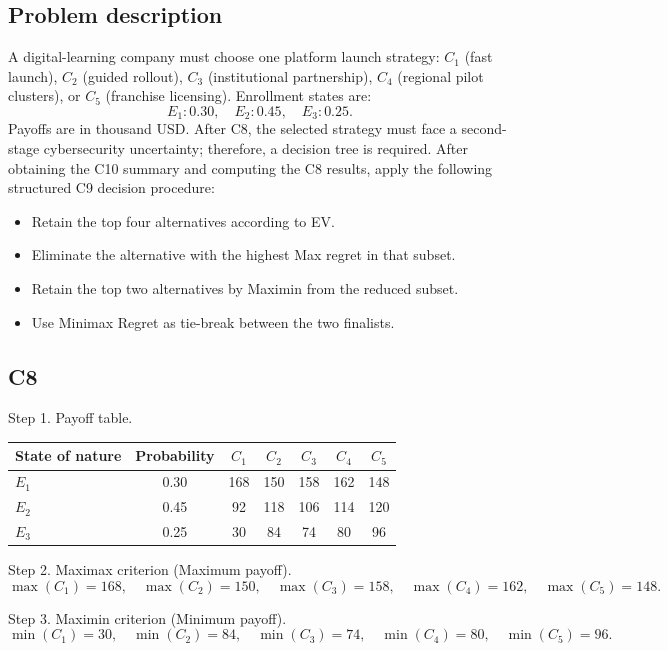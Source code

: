 \begin{ExamProblems}
		\subsection*{Problem description}
		A digital-learning company must choose one platform launch strategy:
		$C_1$ (fast launch), $C_2$ (guided rollout), $C_3$ (institutional partnership), $C_4$ (regional pilot clusters), or $C_5$ (franchise licensing).
		Enrollment states are:
		\[
		E_1:0.30,\quad E_2:0.45,\quad E_3:0.25.
		\]
		Payoffs are in thousand USD.
		After C8, the selected strategy must face a second-stage cybersecurity uncertainty; therefore, a decision tree is required.
		After obtaining the C10 summary and computing the C8 results, apply the following structured C9 decision procedure:
		\begin{itemize}
			\item Retain the top four alternatives according to EV.
			\item Eliminate the alternative with the highest Max regret in that subset.
			\item Retain the top two alternatives by Maximin from the reduced subset.
			\item Use Minimax Regret as tie-break between the two finalists.
		\end{itemize}

		\subsection*{C8}
		Step 1. Payoff table.
		\begin{center}
			\begin{tabular}{l c c c c c c}
				\toprule
				State of nature & Probability & $C_1$ & $C_2$ & $C_3$ & $C_4$ & $C_5$ \\
				\midrule
				$E_1$ & 0.30 & 168 & 150 & 158 & 162 & 148 \\
				$E_2$ & 0.45 & 92 & 118 & 106 & 114 & 120 \\
				$E_3$ & 0.25 & 30 & 84 & 74 & 80 & 96 \\
				\bottomrule
			\end{tabular}
		\end{center}

		Step 2. Maximax criterion (Maximum payoff).
		\[
		\max(C_1)=168,\quad \max(C_2)=150,\quad \max(C_3)=158,\quad \max(C_4)=162,\quad \max(C_5)=148.
		\]

		Step 3. Maximin criterion (Minimum payoff).
		\[
		\min(C_1)=30,\quad \min(C_2)=84,\quad \min(C_3)=74,\quad \min(C_4)=80,\quad \min(C_5)=96.
		\]


\end{ExamProblems}
